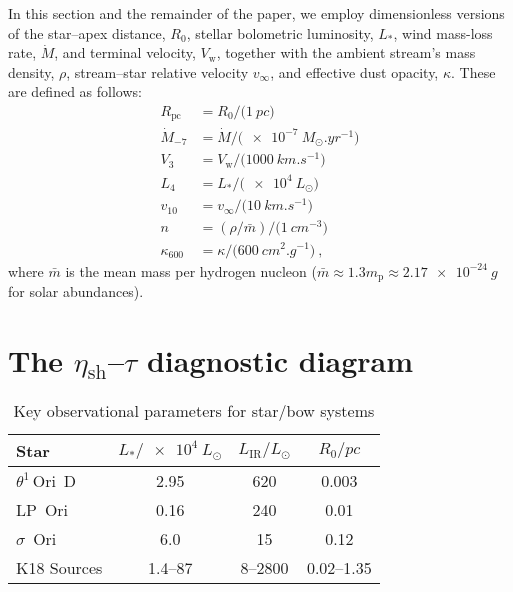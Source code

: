 \documentclass[useAMS, usenatbib, a4paper]{mnras}
\newcommand{\wind}{\ensuremath{_{\text{w}}}}
\newcommand{\thD}{\(\theta^1\)\,Ori~D}
\newcommand\shell{\ensuremath{_{\text{sh}}}}
\begin{document}
In this section and the remainder of the paper, we employ
dimensionless versions of the star--apex distance, \(R_0\), stellar
bolometric luminosity, \(L_*\), wind mass-loss rate, \(\dot{M}\), and
terminal velocity, \(V\wind\), together with the ambient stream's mass
density, \(\rho\), stream--star relative velocity \(v_\infty\), and effective
dust opacity, \(\kappa\).  These are defined as follows:
\begin{align*}
  R_{\text{pc}} &= R_0 / \bigl( \SI{1}{pc} \bigr) \\
  \dot{M}_{-7} &= \dot{M} / \bigl(\SI{e-7}{M_\odot.yr^{-1}}\bigr) \\
  V_3 &= V\wind / \bigl(\SI{1000}{km.s^{-1}}\bigr) \\
  L_4 &= L_* / \bigl(\SI{e4}{L_\odot}\bigr) \\
  v_{10} &= v_\infty / \bigl( \SI{10}{km.s^{-1}} \bigr) \\
  n &= (\rho / \bar{m}) / \bigl( \SI{1}{cm^{-3}} \bigr) \\
  \kappa_{600} &= \kappa / \bigl( \SI{600}{cm^2.g^{-1}} \bigr) \ ,
\end{align*}
where \(\bar{m}\) is the mean mass per hydrogen nucleon
(\(\bar{m} \approx 1.3 m_{\text{p}} \approx \SI{2.17e-24}{g}\) for solar
abundances).

\section[The eta-tau diagnostic diagram]
{\boldmath The \(\eta\shell\)--\(\tau\) diagnostic diagram}
\label{sec:eta-tau-diagnostic}



\begin{table}
  \centering
  \caption[Observational]{Key observational parameters for star/bow systems}
  \label{tab:observations}
  \begin{tabular}{l S S S}
    \toprule
    Star & {\(L_* / \SI{e4}{L_\odot}\)}
    & {\(L_{\text{IR}} / \si{L_\odot}\)} & {\(R_0 / \si{pc}\)} \\
    \midrule
    \thD & 2.95 & 620 & 0.003 \\
    LP~Ori & 0.16 & 240 & 0.01 \\
    \(\sigma\)~Ori & 6.0 & 15 & 0.12 \\[\smallskipamount]
    K18 Sources & \numrange{1.4}{87} & \numrange{8}{2800} & \numrange{0.02}{1.35} \\
    \bottomrule
  \end{tabular}
\end{table}
\end{document}
